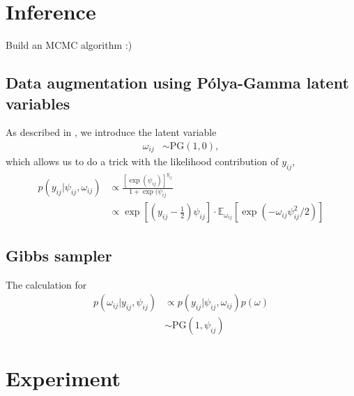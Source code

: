 \documentclass[11pt]{article}
\newcommand{\1}{\mathbf{1}}
\newcommand{\0}{\mathbf{0}}
\begin{document}

\section{Inference}\label{Inference}

Build an MCMC algorithm :)

\subsection{Data augmentation using P\'{o}lya-Gamma latent variables}

As described in \cite{PG}, we introduce the latent variable
%
%
%
\begin{align*}
	\omega_{ij} &\sim \text{PG}(1, 0),
\end{align*}
%
%
%
which allows us to do a trick with the likelihood contribution of $y_{ij}$,
%
%
%
\begin{align*}
	p(y_{ij} | \psi_{ij}, \omega_{ij}) &\propto \frac{\left[ \exp(\psi_{ij}) \right]^{y_{ij}}}{1 + \exp(\psi_{ij}} \\
	&\propto \exp \left[ \left(y_{ij} - \frac{1}{2}\right) \psi_{ij} \right] \cdot \mathbb{E}_{\omega_{ij}}\left[ \exp \left( - \omega_{ij} \psi_{ij}^2 / 2 \right) \right]
\end{align*}

\subsection{Gibbs sampler}

The calculation for 
%
%
%
\begin{align*}
	p(\omega_{ij} | y_{ij}, \psi_{ij}) &\propto p(y_{ij} | \psi_{ij}, \omega_{ij}) p(\omega) \\
	&\sim \text{PG}(1, \psi_{ij})
\end{align*}

%
%
%


\section{Experiment}\label{Experiment}
\end{document}
